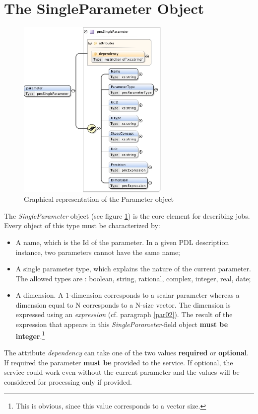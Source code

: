 \documentclass[a4paper,11pt] {ivoa}
\begin{document}
\section{The SingleParameter Object}\label{par01}

\begin{figure}[htbp]
\begin{center}
\includegraphics[width=0.65\textwidth]{pictures/Parameter.jpg} 
\caption{Graphical representation of the Parameter object}
\label{Pic-Parameter}
\end{center}
\end{figure}

The {\it SingleParameter} object (see figure \ref{Pic-Parameter}) is the core element for describing
jobs.
Every object of this type must be characterized by:
\begin{itemize}
\item A name, which is the Id of the parameter. In a given PDL description instance, two parameters cannot 
have the same name;
\item A single parameter type, which explains the nature of the current parameter. The allowed
types are : boolean, string, rational, complex, integer, real, date;
\item A dimension. A $1$-dimension corresponds to a scalar parameter whereas a dimension
equal to N corresponds to a N-size vector. The dimension is expressed using an {\it expression} (cf.
paragraph \ref{par02}). The result of the expression that appears in this {\it
SingleParameter}-field object {\bf must be integer}.\footnote{This is obvious, since this value
corresponds to a vector size.}
\end{itemize}
The attribute {\it dependency} can take one of the two values {\bf required} or {\bf
optional}. If required the parameter {\bf must be} provided to the service. If optional, the service
could work even without the current parameter and the values will be considered for processing only
if provided.\\
\end{document}
